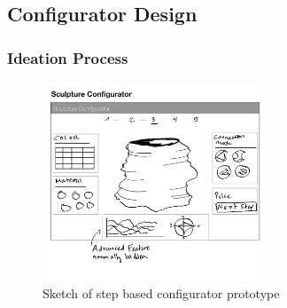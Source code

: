 \documentclass[../medieninformatik-arbeit.tex]{subfiles}
\begin{document}
\subsection{Configurator Design}
\cite{abbasi2012s}
\cite{Konstanzer20078609220}
\cite{rolland2012commerce}

\subsubsection{Ideation Process}


\begin{figure}[h]
\captionsetup{width=0.9\textwidth}
\begin{center}
  \includegraphics[width=0.6\textwidth]{Prototype/img/ui_proto1}
  \caption{Sketch of step based configurator prototype}
\label{fig:uiproto1}
\end{center}
\end{figure}
\end{document}
